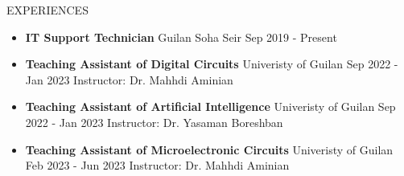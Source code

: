 \documentclass[]{CV}
\begin{document}
\begin{section}{EXPERIENCES}
\begin{multicols}{2}
\begin{itemize}
\item {\textbf{IT Support Technician} \newline Guilan Soha Seir \newline Sep 2019 - Present}
\item {\textbf{Teaching Assistant of Digital Circuits} \newline Univeristy of Guilan \newline Sep 2022 - Jan 2023 \newline Instructor: Dr. Mahhdi Aminian}
\item {\textbf{Teaching Assistant of Artificial Intelligence} \newline Univeristy of Guilan \newline Sep 2022 - Jan 2023 \newline Instructor: Dr. Yasaman Boreshban}
\item {\textbf{Teaching Assistant of Microelectronic Circuits} \newline Univeristy of Guilan \newline Feb 2023 - Jun 2023 \newline Instructor: Dr. Mahhdi Aminian}
\end{itemize}
\end{multicols}
\end{section}
\end{document}
